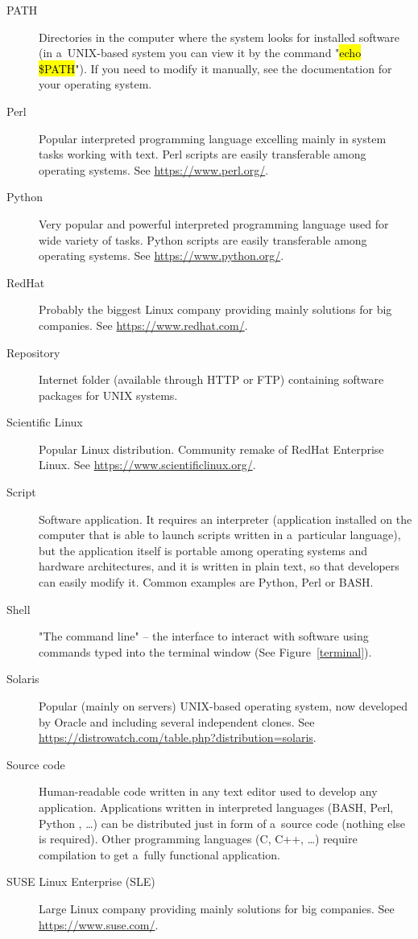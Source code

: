 \documentclass[a4paper, 11pt, twoside]{article}
\renewcommand{\texttt}[1]{\hl{\ttfamily #1}}
\begin{document}
\begin{description}
  \item[PATH] Directories in the computer where the system looks for installed software (in a~UNIX-based system you can view it by the command "\texttt{echo \$PATH}"). If you need to modify it manually, see the documentation for your operating system.
  \item[Perl] Popular interpreted programming language excelling mainly in system tasks working with text. Perl scripts are easily transferable among operating systems. See \url{https://www.perl.org/}.
  \item[Python] Very popular and powerful interpreted programming language used for wide variety of tasks. Python scripts are easily transferable among operating systems. See \url{https://www.python.org/}.
  \item[RedHat] Probably the biggest Linux company providing mainly solutions for big companies. See \url{https://www.redhat.com/}.
  \item[Repository] Internet folder (available through HTTP or FTP) containing software packages for UNIX systems.
  \item[Scientific Linux] Popular Linux distribution. Community remake of RedHat Enterprise Linux. See \url{https://www.scientificlinux.org/}.
  \item[Script] Software application. It requires an interpreter (application installed on the computer that is able to launch scripts written in a~particular language), but the application itself is portable among operating systems and hardware architectures, and it is written in plain text, so that developers can easily modify it. Common examples are Python, Perl or BASH.
  \item[Shell] "The command line" -- the interface to interact with software using commands typed into the terminal window (See Figure~\ref{terminal}).
  \item[Solaris] Popular (mainly on servers) UNIX-based operating system, now developed by Oracle and including several independent clones. See \url{https://distrowatch.com/table.php?distribution=solaris}.
  \item[Source code] Human-readable code written in any text editor used to develop any application. Applications written in interpreted languages (BASH, Perl, Python , \ldots) can be distributed just in form of a~source code (nothing else is required). Other programming languages (C, C++, \ldots) require compilation to get a~fully functional application.
  \item[SUSE Linux Enterprise (SLE)] Large Linux company providing mainly solutions for big companies. See \url{https://www.suse.com/}.

\end{description}
\end{document}
